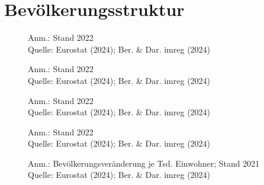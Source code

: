
\section{Bevölkerungsstruktur}

\begin{figure}[p]
	{\centering {}}
	\label{map:einwohner}
	\begin{spacing}{1} \scriptsize
		Anm.: Stand 2022\\
		Quelle: Eurostat (2024); Ber. \& Dar. imreg (2024) \end{spacing}
\end{figure}


\begin{figure}[p]
	{\centering {}}
	\label{map:haushalte}
	\begin{spacing}{1} \scriptsize
		Anm.: Stand 2022\\
		Quelle: Eurostat (2024); Ber. \& Dar. imreg (2024) \end{spacing}
\end{figure}


\begin{figure}[p]
	{\centering {}}
	\label{map:haushaltestadt}
	\begin{spacing}{1} \scriptsize
		Anm.: Stand 2022\\
		Quelle: Eurostat (2024); Ber. \& Dar. imreg (2024) \end{spacing}
\end{figure}


\begin{figure}[p]
	{\centering {}}
	\label{map:bevdichte}
	\begin{spacing}{1} \scriptsize
		Anm.: Stand 2022\\
		Quelle: Eurostat (2024); Ber. \& Dar. imreg (2024) \end{spacing}
\end{figure}


\begin{figure}[p]
	{\centering {}}
	\label{map:bevrate}
	\begin{spacing}{1} \scriptsize
		Anm.: Bevölkerungsveränderung je Tsd. Einwohner; Stand 2021\\
		Quelle: Eurostat (2024); Ber. \& Dar. imreg (2024) \end{spacing}
\end{figure}


